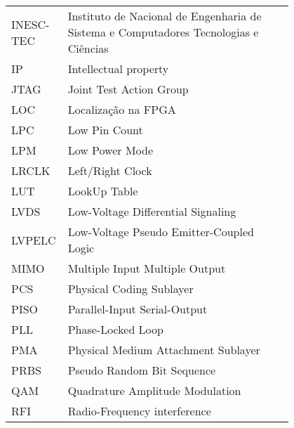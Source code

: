 \begin{flushleft}
\begin{longtable}{l p{0.8\linewidth}}
INESC-TEC & Instituto de Nacional de Engenharia de Sistema e Computadores Tecnologias e Ciências         \\
IP        & Intellectual property                                                                        \\
JTAG      & Joint Test Action Group                                                                      \\
LOC       & Localização na FPGA                                                                          \\
LPC       & Low Pin Count                                                                                \\
LPM       & Low Power Mode                                                                               \\
LRCLK     & Left/Right Clock                                                                             \\
LUT       & LookUp Table                                                                                 \\
LVDS      & Low-Voltage Differential Signaling                                                           \\
LVPELC    & Low-Voltage Pseudo Emitter-Coupled Logic                                                     \\
MIMO      & Multiple Input Multiple Output                                                               \\
PCS       & Physical Coding Sublayer                                                                     \\
PISO      & Parallel-Input Serial-Output                                                                 \\
PLL       & Phase-Locked Loop                                                                            \\
PMA       & Physical Medium Attachment Sublayer                                                          \\
PRBS      & Pseudo Random Bit Sequence                                                                   \\
QAM       & Quadrature Amplitude Modulation                                                              \\
RFI       & Radio-Frequency interference                                                                 \\

\end{longtable}
\end{flushleft}
